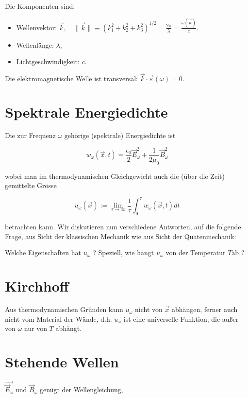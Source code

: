\documentclass[10pt, letterpaper]{article}
\begin{document}
Die Komponenten sind:

\begin{itemize}
  \item Wellenvektor: $\vec{k}, \quad\|\vec{k}\| \equiv\left(k_{1}^{2}+k_{2}^{2}+k_{3}^{2}\right)^{1 / 2}=\frac{2 \pi}{\lambda}=\frac{\omega(\vec{k})}{c}$.
  \item Wellenlänge: $\lambda$,
  \item Lichtgeschwindigkeit: $c$.
\end{itemize}

Die elektromagnetische Welle ist transversal: $\vec{k} \cdot \vec{\varepsilon}(\omega)=0$.

\section*{Spektrale Energiedichte}
Die zur Frequenz $\omega$ gehörige (spektrale) Energiedichte ist

$$
w_{\omega}(\vec{x}, t)=\frac{\epsilon_{0}}{2} \vec{E}_{\omega}^{2}+\frac{1}{2 \mu_{0}} \vec{B}_{\omega}^{2}
$$

wobei man im thermodynamischen Gleichgewicht auch die (über die Zeit) gemittelte Grösse

$$
u_{\omega}(\vec{x}):=\lim _{\tau \rightarrow \infty} \frac{1}{\tau} \int_{0}^{\tau} w_{\omega}(\vec{x}, t) d t
$$

betrachten kann. Wir diskutieren nun verschiedene Antworten, auf die folgende Frage, aus Sicht der klassischen Mechanik wie aus Sicht der Quatenmechanik:

\begin{displayquote}
Welche Eigenschaften hat $u_{\omega}$ ? Speziell, wie hängt $u_{\omega}$ von der Temperatur $T \mathrm{ab}$ ?
\end{displayquote}

\section*{Kirchhoff}
Aus thermodynamischen Gründen kann $u_{\omega}$ nicht von $\vec{x}$ abhängen, ferner auch nicht vom Material der Wände, d.h. $u_{\omega}$ ist eine universelle Funktion, die außer von $\omega$ nur von $T$ abhängt.

\section*{Stehende Wellen}
$\overrightarrow{\vec{E}_{\omega}}$ und $\vec{B}_{\omega}$ genügt der Wellengleichung,
\end{document}
